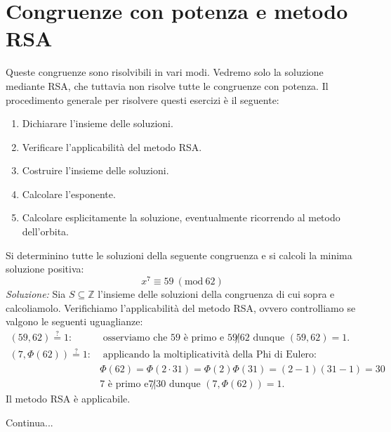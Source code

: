 \documentclass[oneside]{book}
\theoremstyle{remark}
\newcommand{\Mod}[1]{\ (\mathrm{mod}\ #1)} %
\begin{document}
\section{Congruenze con potenza e metodo RSA}
Queste congruenze sono risolvibili in vari modi. Vedremo solo la soluzione
mediante RSA, che tuttavia non risolve tutte le congruenze con potenza. Il
procedimento generale per risolvere questi esercizi è il seguente:
\begin{enumerate}
\item Dichiarare l'insieme delle soluzioni.
\item Verificare l'applicabilità del metodo RSA.
\item Costruire l'insieme delle soluzioni.
\item Calcolare l'esponente.
\item Calcolare esplicitamente la soluzione, eventualmente ricorrendo
al metodo dell'orbita.
\end{enumerate}
\begin{tcolorbox}[colback=blue!30, colframe=blue!30!black, title=Esempio]
Si determinino tutte le soluzioni della seguente congruenza e si calcoli la
minima soluzione positiva:
\[ x^7\equiv59 \Mod{62} \]
\textit{Soluzione:} Sia $S\subseteq\mathbb{Z}$ l'insieme delle soluzioni della congruenza
di cui sopra e calcoliamolo. Verifichiamo l'applicabilità del metodo
RSA, ovvero controlliamo se valgono le seguenti uguaglianze:
\begin{align*}
(59,62)\stackrel{\text{?}}{=}1:      & \text{ osserviamo che 59 è primo
                                        e } 59\not|62 \text{ dunque
                                        } (59,62)=1.\\
(7,\Phi(62))\stackrel{\text{?}}{=}1: & \text{ applicando la moltiplicatività
                                        della Phi di Eulero: }\\
                                    &\Phi(62)=\Phi(2\cdot31)=\Phi(2)\Phi(31)=(2-1)(31-1)=30\\
                                    & \text{7 è primo e} 7\not|30 \text{ dunque } (7,\Phi(62))=1.
\end{align*}
Il metodo RSA è applicabile.
\begin{flushright}
    Continua...
\end{flushright}
\end{tcolorbox}
\end{document}
